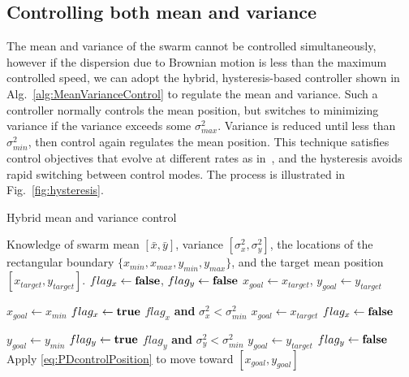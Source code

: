 \subsection{Controlling both mean and variance}

The mean and variance of the swarm cannot be controlled simultaneously, however if the dispersion due to Brownian motion is less than the maximum controlled speed, we can adopt the hybrid, hysteresis-based controller shown in Alg.~\ref{alg:MeanVarianceControl} to regulate the mean and variance.  Such a controller normally controls the mean position, but switches to minimizing variance if the variance exceeds some $\sigma_{max}^2$. 
 Variance is reduced until less than $\sigma_{min}^2$, then control again regulates the mean position. 
 This technique satisfies control objectives that evolve at different rates as in~\cite{kloetzer2007temporal}, and the hysteresis avoids rapid switching between control modes. The process is illustrated in Fig.~\ref{fig:hysteresis}. 


\begin{algorithm}
\caption{Hybrid mean and variance control}\label{alg:MeanVarianceControl}
\begin{algorithmic}[1]
\Require Knowledge of swarm mean $[\bar{x},\bar{y}]$, variance $[\sigma_x^2, \sigma_y^2]$, the locations of the rectangular boundary $\{x_{min}, x_{max}, y_{min}, y_{max}\}$, and the target mean position $[x_{target},y_{target}]$.%
\State $flag_x \gets \textbf{false}$,  $flag_y \gets \textbf{false}$ %
\State $x_{goal} \gets  x_{target}$, $y_{goal} \gets y_{target}$
\Loop

\State $x_{goal}  \gets x_{min}$
\State $flag_x  \gets \textbf{true}$
 {$flag_x$ \textbf{and} $\sigma_x^2 < \sigma_{min}^2$}
\State $x_{goal}  \gets  x_{target}$
\State $flag_x  \gets  \textbf{false}$
\EndIf

\State $y_{goal}  \gets y_{min}$
\State $flag_y  \gets \textbf{true}$
 {$flag_y$ \textbf{and} $\sigma_y^2 < \sigma_{min}^2$}
\State $y_{goal}  \gets  y_{target}$
\State $flag_y  \gets \textbf{false}$
\EndIf
\State Apply \eqref{eq:PDcontrolPosition} to move toward $[x_{goal}, y_{goal}]$
\EndLoop
\end{algorithmic}
\end{algorithm}


